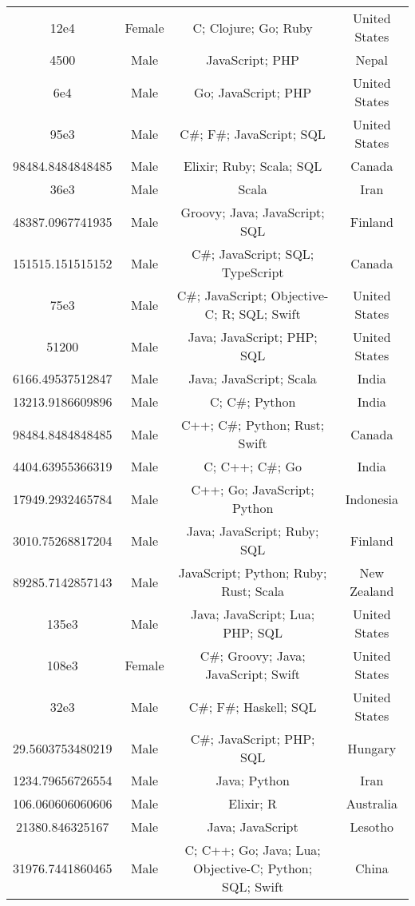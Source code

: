 \begin{center}
\begin{tabular}{ |c|c|c|c| }
12e4  &  Female  &  C; Clojure; Go; Ruby  &  United States  \\ 
4500  &  Male  &  JavaScript; PHP  &  Nepal  \\ 
6e4  &  Male  &  Go; JavaScript; PHP  &  United States  \\ 
95e3  &  Male  &  C\#; F\#; JavaScript; SQL  &  United States  \\ 
98484.8484848485  &  Male  &  Elixir; Ruby; Scala; SQL  &  Canada  \\ 
36e3  &  Male  &  Scala  &  Iran  \\ 
48387.0967741935  &  Male  &  Groovy; Java; JavaScript; SQL  &  Finland  \\ 
151515.151515152  &  Male  &  C\#; JavaScript; SQL; TypeScript  &  Canada  \\ 
75e3  &  Male  &  C\#; JavaScript; Objective-C; R; SQL; Swift  &  United States  \\ 
51200  &  Male  &  Java; JavaScript; PHP; SQL  &  United States  \\ 
6166.49537512847  &  Male  &  Java; JavaScript; Scala  &  India  \\ 
13213.9186609896  &  Male  &  C; C\#; Python  &  India  \\ 
98484.8484848485  &  Male  &  C++; C\#; Python; Rust; Swift  &  Canada  \\ 
4404.63955366319  &  Male  &  C; C++; C\#; Go  &  India  \\ 
17949.2932465784  &  Male  &  C++; Go; JavaScript; Python  &  Indonesia  \\ 
3010.75268817204  &  Male  &  Java; JavaScript; Ruby; SQL  &  Finland  \\ 
89285.7142857143  &  Male  &  JavaScript; Python; Ruby; Rust; Scala  &  New Zealand  \\ 
135e3  &  Male  &  Java; JavaScript; Lua; PHP; SQL  &  United States  \\ 
108e3  &  Female  &  C\#; Groovy; Java; JavaScript; Swift  &  United States  \\ 
32e3  &  Male  &  C\#; F\#; Haskell; SQL  &  United States  \\ 
29.5603753480219  &  Male  &  C\#; JavaScript; PHP; SQL  &  Hungary  \\ 
1234.79656726554  &  Male  &  Java; Python  &  Iran  \\ 
106.060606060606  &  Male  &  Elixir; R  &  Australia  \\ 
21380.846325167  &  Male  &  Java; JavaScript  &  Lesotho  \\ 
31976.7441860465  &  Male  &  C; C++; Go; Java; Lua; Objective-C; Python; SQL; Swift  &  China  \\ 

\end{tabular}
\end{center}
